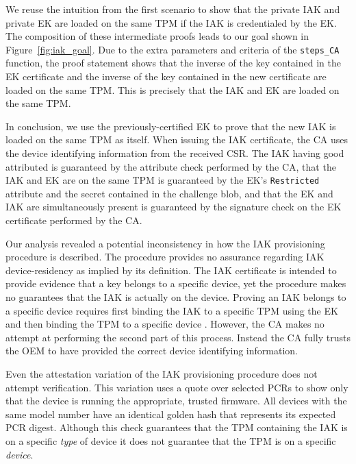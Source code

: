 \documentclass[runningheads]{llncs}
\begin{document}
We reuse the intuition from the first scenario to show that the private
IAK and private EK are loaded on the same TPM if the IAK is
credentialed by the EK.
The composition of these intermediate proofs leads
to our goal shown in Figure~\ref{fig:iak_goal}.  Due to the extra
parameters and criteria of the \verb|steps_CA| function, the proof
statement shows that the inverse of the key contained in the EK
certificate and the inverse of the key contained in the new
certificate are loaded on the same TPM. This is precisely that the IAK
and EK are loaded on the same TPM.

In conclusion, we use the previously-certified EK to prove that the
new IAK is loaded on the same TPM as itself. When issuing the IAK
certificate, the CA uses the device identifying information from the
received CSR.  The IAK having good attributed is guaranteed by the
attribute check performed by the CA, that the IAK and EK are on the
same TPM is guaranteed by the EK's \verb|Restricted| attribute and the
secret contained in the challenge blob, and that the EK and IAK are
simultaneously present is guaranteed by the signature check on the EK
certificate performed by the CA.

Our analysis revealed a potential inconsistency in how the IAK
provisioning procedure is described. The procedure provides no
assurance regarding IAK device-residency as implied by its definition.
The IAK certificate is intended to provide evidence that a key belongs
to a specific device, yet the procedure makes no guarantees that the
IAK is actually on the device.  Proving an IAK belongs to a specific
device requires first binding the IAK to a specific TPM using the EK
and then binding the TPM to a specific device \citep{DevIDSpec-TCG}.
However, the CA makes no attempt at performing the second part of this
process. Instead the CA fully trusts the OEM to have provided the
correct device identifying information.

Even the attestation variation of the IAK provisioning procedure does
not attempt verification. This variation uses a quote over selected
PCRs to show only that the device is running the appropriate, trusted
firmware. All devices with the same model number have an identical
golden hash that represents its expected PCR digest.  Although this
check guarantees that the TPM containing the IAK is on a specific
\textit{type} of device it does not guarantee that the TPM is on a
specific \emph{device}.
\end{document}
